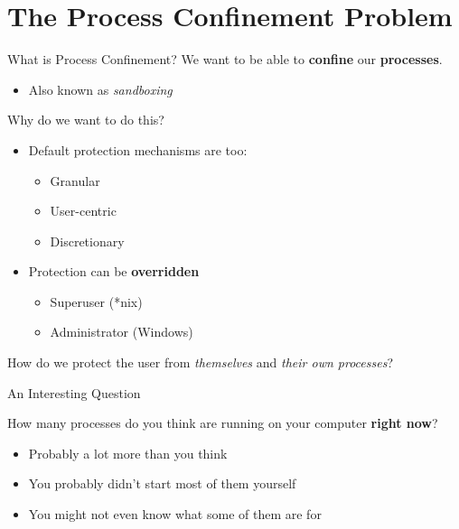 \documentclass[12pt, dvipsnames, aspectratio=169]{beamer}
\begin{document}
\section{The Process Confinement Problem}

\begin{frame}[c]{What is Process Confinement?}
We want to be able to \textbf{confine} our \textbf{processes}.
\begin{itemize}
    \item Also known as \textit{sandboxing}
\end{itemize}
\vfill
Why do we want to do this?
\begin{itemize}
    \item Default protection mechanisms are too:
    \begin{itemize}
        \item Granular
        \item User-centric
        \item Discretionary
    \end{itemize}
    \item Protection can be \textbf{overridden}
    \begin{itemize}
        \item Superuser (*nix)
        \item Administrator (Windows)
    \end{itemize}
\end{itemize}
\vfill
How do we protect the user from \textit{themselves} and \textit{their own processes}?
\end{frame}

\begin{frame}[c]{An Interesting Question}
\begin{center}
    \Huge
    How many processes do you think are running on your computer \textbf{right now}?
\end{center}
\vfill
\begin{itemize}
    \item Probably a lot more than you think
    \item You probably didn't start most of them yourself
    \item You might not even know what some of them are for
\end{itemize}
\end{frame}
\end{document}
